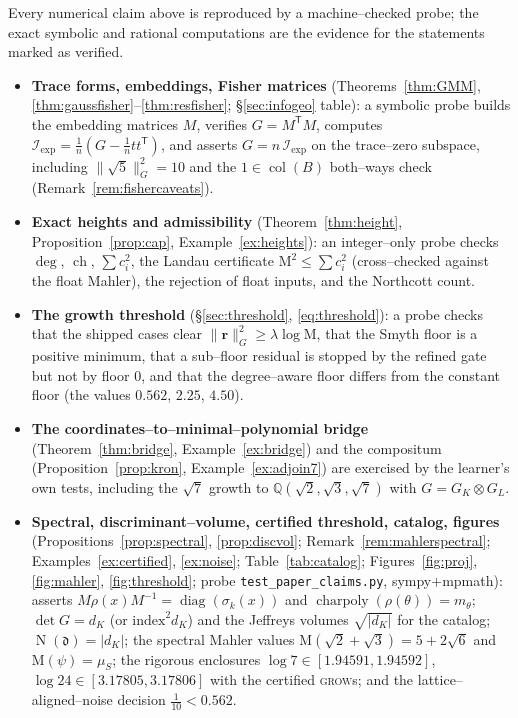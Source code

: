 \documentclass[11pt]{article}
\theoremstyle{plain}
\theoremstyle{definition}
\theoremstyle{remark}
\newcommand{\Q}{\mathbb{Q}}
\newcommand{\K}{K}
\newcommand{\Nm}{\operatorname{N}}
\newcommand{\charpoly}{\operatorname{charpoly}}
\newcommand{\Mah}{\mathrm{M}}
\newcommand{\Fish}{\mathcal{I}}
\newcommand{\rr}{\mathbf{r}}
\newcommand{\GG}{G}
\newcommand{\BB}{B}
\newcommand{\transpose}{^{\mathsf{T}}}
\newcommand{\inv}{^{-1}}
\DeclareMathOperator{\col}{col}
\DeclareMathOperator{\diag}{diag}
\begin{document}
Every numerical claim above is reproduced by a machine--checked probe; the exact symbolic and rational
computations are the evidence for the statements marked as verified.
\begin{itemize}[leftmargin=*]
  \item \textbf{Trace forms, embeddings, Fisher matrices} (Theorems~\ref{thm:GMM},
        \ref{thm:gaussfisher}--\ref{thm:resfisher}; \S\ref{sec:infogeo} table): a symbolic probe builds the
        embedding matrices $M$, verifies $\GG=M\transpose M$, computes
        $\Fish_{\mathrm{exp}}=\tfrac1n(\GG-\tfrac1n tt\transpose)$, and asserts $\GG=n\,\Fish_{\mathrm{exp}}$
        on the trace--zero subspace, including $\lVert\sqrt5\rVert_{\GG}^2=10$ and the
        $1\in\col(\BB)$ both--ways check (Remark~\ref{rem:fishercaveats}).
  \item \textbf{Exact heights and admissibility} (Theorem~\ref{thm:height}, Proposition~\ref{prop:cap},
        Example~\ref{ex:heights}): an integer--only probe checks $\deg$, $\operatorname{ch}$, $\sum c_i^2$,
        the Landau certificate $\Mah^2\le\sum c_i^2$ (cross--checked against the float Mahler), the
        rejection of float inputs, and the Northcott count.
  \item \textbf{The growth threshold} (\S\ref{sec:threshold}, \eqref{eq:threshold}): a probe checks that the
        shipped cases clear $\lVert\rr\rVert_{\GG}^2\ge\lambda\log\Mah$, that the Smyth floor is a positive
        minimum, that a sub--floor residual is stopped by the refined gate but not by floor $0$, and that the
        degree--aware floor differs from the constant floor (the values $0.562$, $2.25$, $4.50$).
  \item \textbf{The coordinates--to--minimal--polynomial bridge} (Theorem~\ref{thm:bridge},
        Example~\ref{ex:bridge}) and the compositum (Proposition~\ref{prop:kron}, Example~\ref{ex:adjoin7})
        are exercised by the learner's own tests, including the $\sqrt7$ growth to
        $\Q(\sqrt2,\sqrt3,\sqrt7)$ with $\GG=\GG_\K\otimes\GG_L$.
  \item \textbf{Spectral, discriminant--volume, certified threshold, catalog, figures}
        (Propositions~\ref{prop:spectral}, \ref{prop:discvol}; Remark~\ref{rem:mahlerspectral};
        Examples~\ref{ex:certified}, \ref{ex:noise}; Table~\ref{tab:catalog}; Figures~\ref{fig:proj},
        \ref{fig:mahler}, \ref{fig:threshold}; probe \texttt{test\_paper\_claims.py}, sympy$+$mpmath): asserts
        $M\rho(x)M\inv=\diag(\sigma_k(x))$ and $\charpoly(\rho(\theta))=m_\theta$; $\det\GG=d_\K$ (or
        $\text{index}^2 d_\K$) and the Jeffreys volumes $\sqrt{|d_\K|}$ for the catalog; $\Nm(\mathfrak d)=|d_\K|$;
        the spectral Mahler values $\Mah(\sqrt2+\sqrt3)=5+2\sqrt6$ and $\Mah(\psi)=\mu_S$; the rigorous
        enclosures $\log7\in[1.94591,1.94592]$, $\log24\in[3.17805,3.17806]$ with the certified \textsc{grow}s;
        and the lattice--aligned--noise decision $\tfrac1{10}<0.562$.
\end{itemize}
\end{document}
